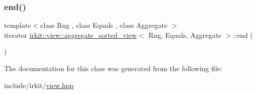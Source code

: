 \subsubsection{\texorpdfstring{end()}{end()}}
{\footnotesize\ttfamily template$<$class Rng , class Equals , class Aggregate $>$ \\
iterator \mbox{\hyperlink{classirkit_1_1view_1_1aggregate__sorted__view}{irkit\+::view\+::aggregate\+\_\+sorted\+\_\+view}}$<$ Rng, Equals, Aggregate $>$\+::end (\begin{DoxyParamCaption}{ }\end{DoxyParamCaption})\hspace{0.3cm}{\ttfamily [inline]}}



The documentation for this class was generated from the following file\+:\begin{DoxyCompactItemize}
\item 
include/irkit/\mbox{\hyperlink{view_8hpp}{view.\+hpp}}\end{DoxyCompactItemize}
